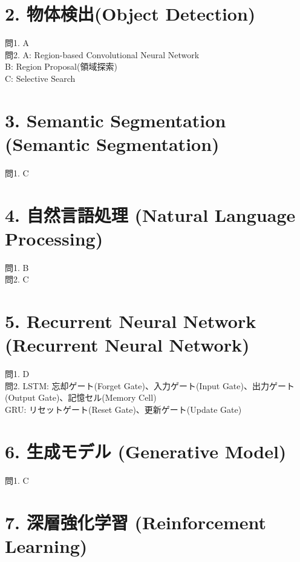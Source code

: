 \documentclass[
  letterpaper,
  DIV=11,
  numbers=noendperiod]{scrreprt}
\begin{document}
\section{2. 物体検出(Object
Detection)}\label{ux7269ux4f53ux691cux51faobject-detection-1}

問1. A\\
問2. A: Region-based Convolutional Neural Network\\
B: Region Proposal(領域探索)\\
C: Selective Search

\section{3. Semantic Segmentation (Semantic
Segmentation)}\label{semantic-segmentation-semantic-segmentation-1}

問1. C

\section{4. 自然言語処理 (Natural Language
Processing)}\label{ux81eaux7136ux8a00ux8a9eux51e6ux7406-natural-language-processing-1}

問1. B\\
問2. C

\section{5. Recurrent Neural Network (Recurrent Neural
Network)}\label{recurrent-neural-network-recurrent-neural-network-1}

問1. D\\
問2. LSTM: 忘却ゲート(Forget Gate)、入力ゲート(Input
Gate)、出力ゲート(Output Gate)、記憶セル(Memory Cell)\\
GRU: リセットゲート(Reset Gate)、更新ゲート(Update Gate)

\section{6. 生成モデル (Generative
Model)}\label{ux751fux6210ux30e2ux30c7ux30eb-generative-model-1}

問1. C

\section{7. 深層強化学習 (Reinforcement
Learning)}\label{ux6df1ux5c64ux5f37ux5316ux5b66ux7fd2-reinforcement-learning-1}
\end{document}
